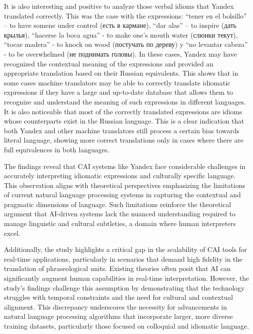 It is also interesting and positive to analyze those verbal idioms that
Yandex translated correctly. This was the case with the expressions:
``tener en el bolsillo'' -- to have somene under control (\textrussian{есть в
кармане}), ``dar alas'' -- to inspire (\textrussian{дать крылья}), ``hacerse la boca
agua'' - to make one's mouth water (\textrussian{слюнки текут}),
``tocar madera'' - to knock on wood (\textrussian{постучать по дереву}) y ``no
levantar cabeza'' - to be overwhelmed (\textrussian{не поднимать головы}). In these
cases, Yandex may have recognized the contextual meaning of the
expressions and provided an appropriate translation based on their
Russian equivalents. This shows that in some cases machine translators
may be able to correctly translate idiomatic expressions if they have a
large and up-to-date database that allows them to recognize and
understand the meaning of such expressions in different languages. It is
also noticeable that most of the correctly translated expressions are
idioms whose counterparts exist in the Russian language. This is a clear
indication that both Yandex and other machine translators still process
a certain bias towards literal language, showing more correct
translations only in cases where there are full equivalences in both
languages.

The findings reveal that CAI systems like Yandex face considerable
challenges in accurately interpreting idiomatic expressions and
culturally specific language. This observation aligns with theoretical
perspectives emphasizing the limitations of current natural language
processing systems in capturing the contextual and pragmatic dimensions
of language. Such limitations reinforce the theoretical argument that
AI-driven systems lack the nuanced understanding required to manage
linguistic and cultural subtleties, a domain where human interpreters
excel.

Additionally, the study highlights a critical gap in the scalability of
CAI tools for real-time applications, particularly in scenarios that
demand high fidelity in the translation of phraseological units.
Existing theories often posit that AI can significantly augment human
capabilities in real-time interpretation. However, the
study's findings challenge this assumption by
demonstrating that the technology struggles with temporal constraints
and the need for cultural and contextual alignment. This discrepancy
underscores the necessity for advancements in natural language
processing algorithms that incorporate larger, more diverse training
datasets, particularly those focused on colloquial and idiomatic
language.

